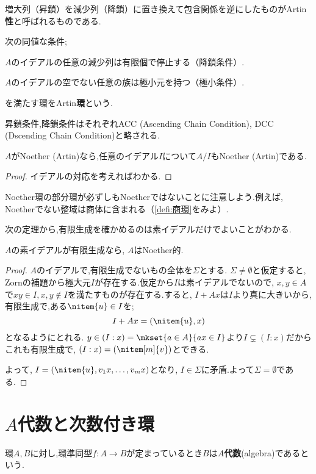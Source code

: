 増大列（昇鎖）を減少列（降鎖）に置き換えて包含関係を逆にしたものがArtin\textbf{性}と呼ばれるものである.

\begin{defi}[Artin環]
	次の同値な条件;
	\begin{sakura}
		\item  $A$のイデアルの任意の減少列は有限個で停止する（降鎖条件）.
		\item $A$のイデアルの空でない任意の族は極小元を持つ（極小条件）.
	\end{sakura}
	を満たす環をArtin\textbf{環}という.
\end{defi}

昇鎖条件,降鎖条件はそれぞれACC (Ascending Chain Condition), DCC (Dscending Chain Condition)と略される.

\begin{prop}
	$A$がNoether (Artin)なら,任意のイデアル$I$について$A/I$もNoether (Artin)である.
\end{prop}
\begin{proof}
	イデアルの対応を考えればわかる.
\end{proof}

Noether環の部分環が必ずしもNoetherではないことに注意しよう.例えば, Noetherでない整域は商体に含まれる（\ref{defi:商環}をみよ）.

次の定理から,有限生成を確かめるのは素イデアルだけでよいことがわかる.
\begin{thm}[I.S.Cohen]
	$A$の素イデアルが有限生成なら, $A$はNoether的.
\end{thm}
\begin{proof}
	$A$のイデアルで,有限生成でないもの全体を$\Sigma$とする. $\Sigma\neq\emptyset$と仮定すると, Zornの補題から極大元$I$が存在する.仮定から$I$は素イデアルでないので, $x,y\in A$で$xy\in I,x,y\not\in I$を満たすものが存在する.すると, $I+Ax$は$I$より真に大きいから,有限生成で,ある$\nitem{u}\in I$を;
	\[I+Ax=(\nitem{u},x)\]
	となるようにとれる. $y\in (I:x)=\mkset{a\in A}{ax\in I}$より$I\subsetneq(I:x)$だからこれも有限生成で, $(I:x)=(\nitem[m]{v})$とできる.
	
	よって, $I=(\nitem{u},v_1x,\dots,v_mx)$となり, $I\in\Sigma$に矛盾.よって$\Sigma=\emptyset$である.
\end{proof}

\section{$A$代数と次数付き環}
\begin{defi}[$A$代数]
	環$A,B$に対し,環準同型$f:A\to B$が定まっているとき$B$は$A$\textbf{代数}(algebra)であるという.
\end{defi}

